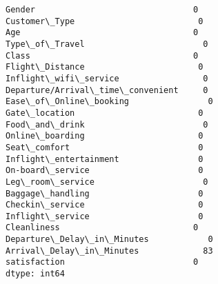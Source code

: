 \documentclass[11pt]{article}
\makeatletter
\newcommand{\boxspacing}{\kern\kvtcb@left@rule\kern\kvtcb@boxsep}
\newcommand{\prompt}[4]{
        {\ttfamily\llap{{\color{#2}[#3]:\hspace{3pt}#4}}\vspace{-\baselineskip}}
    }
\makeatother
\begin{document}
            \begin{tcolorbox}[breakable, size=fbox, boxrule=.5pt, pad at break*=1mm, opacityfill=0]
\prompt{Out}{outcolor}{11}{\boxspacing}
\begin{Verbatim}[commandchars=\\\{\}]
Gender                                0
Customer\_Type                         0
Age                                   0
Type\_of\_Travel                        0
Class                                 0
Flight\_Distance                       0
Inflight\_wifi\_service                 0
Departure/Arrival\_time\_convenient     0
Ease\_of\_Online\_booking                0
Gate\_location                         0
Food\_and\_drink                        0
Online\_boarding                       0
Seat\_comfort                          0
Inflight\_entertainment                0
On-board\_service                      0
Leg\_room\_service                      0
Baggage\_handling                      0
Checkin\_service                       0
Inflight\_service                      0
Cleanliness                           0
Departure\_Delay\_in\_Minutes            0
Arrival\_Delay\_in\_Minutes             83
satisfaction                          0
dtype: int64
\end{Verbatim}
\end{tcolorbox}
        
\end{document}
